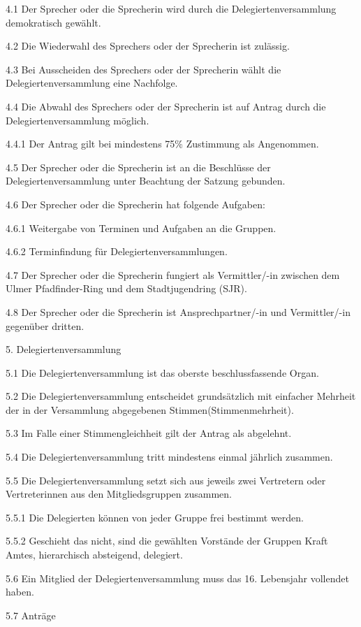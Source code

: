 4.1 Der Sprecher oder die Sprecherin wird durch die Delegiertenversammlung demokratisch gewählt.

4.2 Die Wiederwahl des Sprechers oder der Sprecherin ist zulässig.

4.3 Bei Ausscheiden des Sprechers oder der Sprecherin wählt die Delegiertenversammlung eine Nachfolge.

4.4 Die Abwahl des Sprechers oder der Sprecherin ist auf Antrag durch die Delegiertenversammlung möglich.

4.4.1 Der Antrag gilt bei mindestens 75\% Zustimmung als Angenommen.

4.5 Der Sprecher oder die Sprecherin ist an die Beschlüsse der Delegiertenversammlung unter Beachtung der Satzung gebunden.

4.6 Der Sprecher oder die Sprecherin hat folgende Aufgaben:

4.6.1 Weitergabe von Terminen und Aufgaben an die Gruppen.

4.6.2 Terminfindung für Delegiertenversammlungen.

4.7 Der Sprecher oder die Sprecherin fungiert als Vermittler/-in zwischen dem Ulmer Pfadfinder-Ring und dem Stadtjugendring (SJR).

4.8 Der Sprecher oder die Sprecherin ist Ansprechpartner/-in und Vermittler/-in gegenüber dritten.

5. Delegiertenversammlung

5.1 Die Delegiertenversammlung ist das oberste beschlussfassende Organ.

5.2 Die Delegiertenversammlung entscheidet grundsätzlich mit einfacher Mehrheit der in der Versammlung abgegebenen Stimmen(Stimmenmehrheit).

5.3 Im Falle einer Stimmengleichheit gilt der Antrag als abgelehnt.

5.4 Die Delegiertenversammlung tritt mindestens einmal jährlich zusammen.

5.5 Die Delegiertenversammlung setzt sich aus jeweils zwei Vertretern oder Vertreterinnen aus den Mitgliedsgruppen zusammen.

5.5.1 Die Delegierten können von jeder Gruppe frei bestimmt werden.

5.5.2 Geschieht das nicht, sind die gewählten Vorstände der Gruppen Kraft Amtes, hierarchisch absteigend, delegiert.

5.6 Ein Mitglied der Delegiertenversammlung muss das 16. Lebensjahr vollendet haben.

5.7 Anträge

